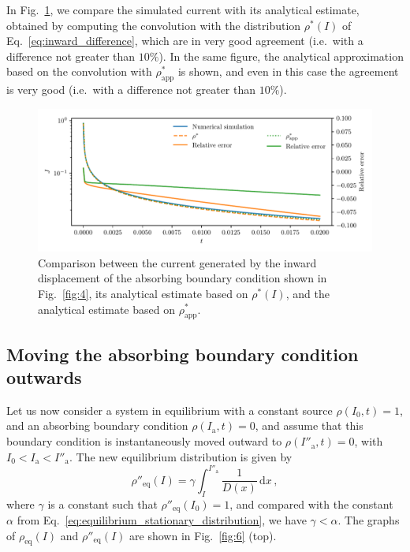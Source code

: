 {In Fig.~\ref{fig:5}, we compare the simulated current with its analytical estimate, obtained by computing the convolution with the distribution $\rho^\ast(I)$ of Eq.~\eqref{eq:inward_difference}, which are in very good agreement {(i.e.\ with a difference not greater than $10\%$)}. In the same figure, the analytical approximation based on the convolution with $\rho^\ast_\text{app}$ is shown, and even in this case the agreement is very good {(i.e.\ with a difference not greater than $10\%$)}.

\begin{figure}[htp]
    \centering
    \includegraphics[width=\textwidth]{4_probing_the_diffusive_behavior/figs/final/current_backwards.pdf}
    \caption{Comparison between the current generated by the inward displacement of the absorbing boundary condition shown in Fig.~\ref{fig:4}, its analytical estimate based on $\rho^\ast(I)$, and the analytical estimate based on $\rho^\ast_\text{app}$.}
    \label{fig:5}
\end{figure}


\subsection{Moving the absorbing boundary condition outwards}


Let us now consider a system in equilibrium with a constant source $\rho(I_0, t)=1$, and an absorbing boundary condition $\rho(I_\mathrm{a}, t)=0$, and assume that this boundary condition is instantaneously moved outward to $\rho(I''_\mathrm{a}, t)=0$, with $I_0 < I_\mathrm{a} < I''_\mathrm{a}$. The new equilibrium distribution is given by
\begin{equation}
    \rho''_\text{eq}(I) = \gamma \int_I^{I''_\mathrm{a}} \frac{1}{D(x)}\,\mathrm{d}x\,,
\end{equation}
where $\gamma$ is a constant such that $\rho''_\text{eq}(I_0)=1$, and compared with the constant $\alpha$ from Eq.~\eqref{eq:equilibrium_stationary_distribution}, we have $\gamma < \alpha$. The graphs of $\rho_\text{eq}(I)$ and $\rho''_\text{eq}(I)$ are shown in Fig.~\ref{fig:6} (top). 

}

